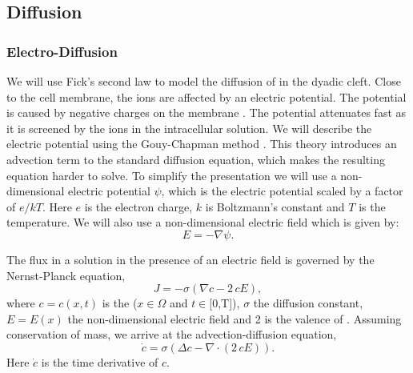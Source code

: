 \subsection*{\Ca Diffusion}
\label{sec:ca-diffusion}

\subsubsection*{Electro-Diffusion}
We will use Fick's second law to model the diffusion of \Ca in the dyadic cleft. Close to the cell membrane, the ions are affected by an electric potential. The potential is caused by negative charges on the membrane \cite{McLaughlinSzaboEtAl1971,LangnerCafisoEtAl1990}. The potential attenuates fast as it is screened by the ions in the intracellular solution. We will describe the electric potential using the Gouy-Chapman method \cite{Grahame1947}. This theory introduces an advection term to the standard diffusion equation, which makes the resulting equation harder to solve. To simplify the presentation we will use a non-dimensional electric potential $\psi$, which is the electric potential scaled by a factor of $e/kT$. Here $e$ is the electron charge, $k$ is Boltzmann's constant and $T$ is the temperature. We will also use a non-dimensional electric field which is given by:
\begin{equation}
  \label{eq:electric_field}
  E=-\nabla\psi.
\end{equation}

The \Ca flux in a solution in the presence of an electric field is governed by the Nernst-Planck equation,
\begin{equation}
  \label{eq:nernst-planck}
  J = -\sigma\left(\nabla c-2\,cE\right),
\end{equation}
where $c = c(x,t)$ is the \CaC ($x\in\Omega$ and $t\in$[0,T]), $\sigma$ the diffusion constant, $E = E(x)$ the non-dimensional electric field and 2 is the valence of \Ca. Assuming conservation of mass, we arrive at the advection-diffusion equation,
\begin{equation}
  \label{eq:advection-diffusion}
  \dot{c}=\sigma\left(\Delta c - \nabla\cdot\left(2\,cE\right)\right).
\end{equation}
Here $\dot{c}$ is the time derivative of $c$.\par

